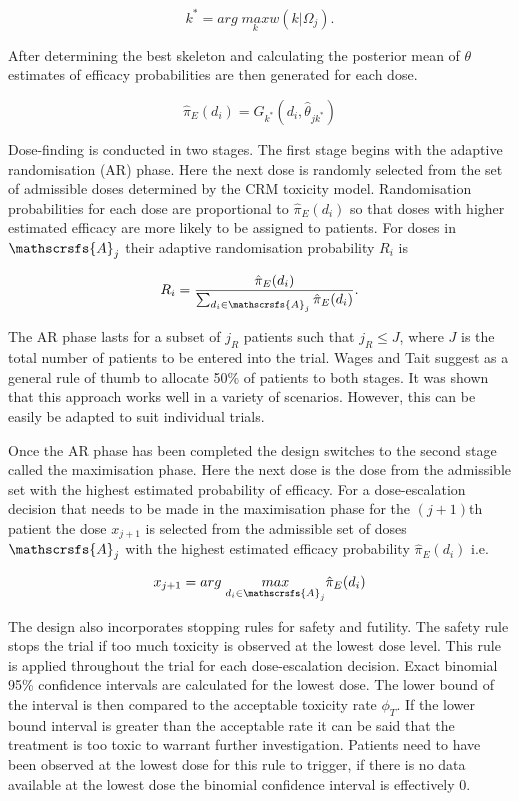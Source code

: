 \begin{equation}
	k^* = arg \; \underset{k}{max}w(k|\Omega_j).
\end{equation}

After determining the best skeleton and calculating the posterior mean of $\theta$ estimates of efficacy probabilities are then generated for each dose. 

\begin{equation}
	\hat{\pi}_E(d_i) = G_{k^*} (d_i, \hat{\theta}_{jk^*})
\end{equation}

Dose-finding is conducted in two stages. The first stage begins with the adaptive randomisation (AR) phase. Here the next dose is randomly selected from the set of admissible doses determined by the CRM toxicity model. Randomisation probabilities for each dose are proportional to $\hat{\pi}_E(d_i)$ so that doses with higher estimated efficacy are more likely to be assigned to patients. For doses in $\mathscrsfs{A}_j$ their adaptive randomisation probability $R_i$ is 

\begin{equation}
	\label{WT:eq_WT-ARprob}
	R_i = \frac{\hat{\pi}_E(d_i)}{\sum_{d_i \in \mathscrsfs{A}_j}\hat{\pi}_E(d_i)}. 
\end{equation}

The AR phase lasts for a subset of $j_R$ patients such that $j_R \leq J$, where $J$ is the total number of patients to be entered into the trial. Wages and Tait suggest as a general rule of thumb to allocate 50\% of patients to both stages. It was shown that this approach works well in a variety of scenarios. However, this can be easily be adapted to suit individual trials. 

Once the AR phase has been completed the design switches to the second stage called the maximisation phase. Here the next dose is the dose from the admissible set with the highest estimated probability of efficacy. For a dose-escalation decision that needs to be made in the maximisation phase for the $(j+1)$th patient the dose $x_{j+1}$ is selected from the admissible set of doses $\mathscrsfs{A}_j$ with the highest estimated efficacy probability $\hat{\pi}_E(d_i)$ i.e. 

\begin{equation}
	x_{j+1} = arg \; \underset{d_i \in \mathscrsfs{A}_j}{max}\hat{\pi}_E(d_i)
\end{equation}

The design also incorporates stopping rules for safety and futility. The safety rule stops the trial if too much toxicity is observed at the lowest dose level. This rule is applied throughout the trial for each dose-escalation decision. Exact binomial 95\% confidence intervals are calculated for the lowest dose. The lower bound of the interval is then compared to the acceptable toxicity rate $\phi_T$. If the lower bound interval is greater than the acceptable rate it can be said that the treatment is too toxic to warrant further investigation. Patients need to have been observed at the lowest dose for this rule to trigger, if there is no data available at the lowest dose the binomial confidence interval is effectively 0. 

